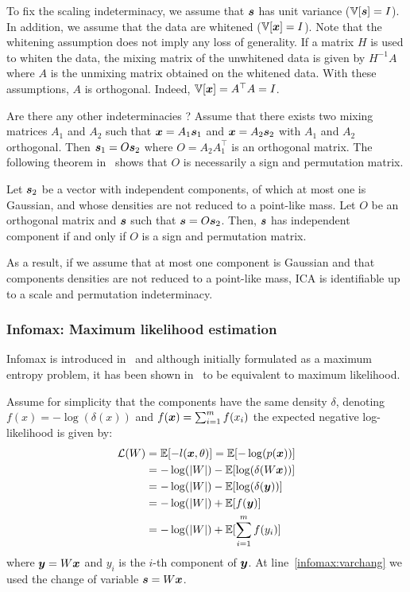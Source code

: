 To fix the scaling indeterminacy, we assume that $\boldsymbol{s}$ has unit variance ($\mathbb{V}[\boldsymbol{s}] = I$).
In addition, we assume that the data are whitened ($\mathbb{V}[\boldsymbol{x}] =
I$). Note that the whitening assumption does not imply any loss of generality. If a matrix $H$
is used to whiten the data, the mixing matrix of the unwhitened data is given by $H^{-1} A$ where $A$ is
the unmixing matrix obtained on the whitened data.
With these assumptions, $A$ is orthogonal.
Indeed, $\mathbb{V}[\boldsymbol{x}] = A^{\top} A = I$. 

Are there any other indeterminacies ? Assume that there exists two mixing matrices $A_1$ and $A_2$ such that
$\boldsymbol{x} = A_1 \boldsymbol{s}_1$ and $\boldsymbol{x} = A_2 \boldsymbol{s}_2$ with $A_1$ and $A_2$ orthogonal. Then
$\boldsymbol{s}_1 = O \boldsymbol{s}_2$ where $O=A_2 A_1^{\top}$ is an orthogonal matrix. 
The following theorem in~\cite{comon1994independent}
shows that $O$ is necessarily a sign and permutation matrix.
\begin{theorem}
  Let $\boldsymbol{s}_2$  be a  vector  with  independent 
  components, of   which  at  most  one  is  Gaussian,  and whose  densities
  are  not  reduced  to  a  point-like  mass. Let $O$ be an orthogonal matrix
  and $\boldsymbol{s}$ such that $\boldsymbol{s} = O \boldsymbol{s}_2$.
  Then, $\boldsymbol{s}$ has independent component if and only if $O$ is a sign and
  permutation matrix.
\end{theorem}

As a result, if we assume that at most one component is Gaussian and that
components densities are not reduced to a point-like mass, ICA is identifiable up to a scale and permutation indeterminacy.

\subsubsection{Infomax: Maximum likelihood estimation}
Infomax is introduced in~\cite{bell1995information} and although initially formulated as a maximum entropy problem, it has been shown in~\cite{cois1997infomax} to be equivalent to maximum likelihood.

Assume for simplicity that the components have the same density $\delta$, denoting $f(x) =
-\log(\delta(x))$ and $f(\boldsymbol{x}) = \sum_{i=1}^m f(x_i)$ the expected negative log-likelihood is given by:
\begin{align}
  \mathcal{L}(W) &= \mathbb{E}[-l(\boldsymbol{x}, \theta)] = \mathbb{E}[- \log(p(\boldsymbol{x}))] \\
        &= -\log(|W|) - \mathbb{E}[\log(\delta(W \boldsymbol{x}))] \label{infomax:varchang} \\ 
        &= -\log(|W|) - \mathbb{E}[\log(\delta(\boldsymbol{y}))] \\
        &= -\log(|W|) + \mathbb{E}[f(\boldsymbol{y})] \\
        &= -\log(|W|) + \mathbb{E}[\sum_{i=1}^m f(y_i)]
\end{align}
where $\boldsymbol{y} = W \boldsymbol{x}$ and $y_i$ is the $i$-th component of $\boldsymbol{y}$.
At line~\eqref{infomax:varchang} we used the change of variable $\boldsymbol{s} = W \boldsymbol{x}$.

